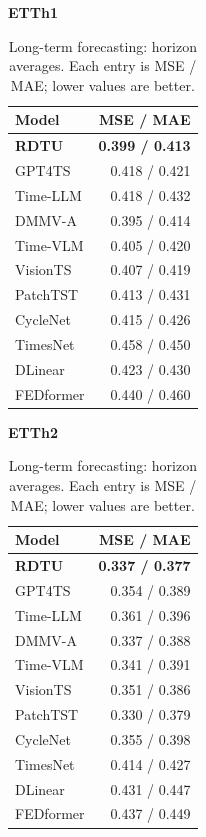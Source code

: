 \begin{table}[H]\centering\small
\caption{Long-term forecasting: horizon averages. Each entry is MSE / MAE; lower values are better.}\label{tab:long-term-forecasting-brief}
\begin{minipage}[t]{0.48\linewidth}\vspace{0pt}\centering\small
\textbf{ETTh1}\par\smallskip
\begin{tabular}{lr}\toprule Model & MSE / MAE\\\midrule
\rowcolor{blue!5}
\textbf{RDTU} & \textbf{0.399 / 0.413}\\
GPT4TS & 0.418 / 0.421\\
Time-LLM & 0.418 / 0.432\\
DMMV-A & 0.395 / 0.414\\
Time-VLM & 0.405 / 0.420\\
VisionTS & 0.407 / 0.419\\
PatchTST & 0.413 / 0.431\\
CycleNet & 0.415 / 0.426\\
TimesNet & 0.458 / 0.450\\
DLinear & 0.423 / 0.430\\
FEDformer & 0.440 / 0.460\\
\bottomrule\end{tabular}\end{minipage}\hfill\begin{minipage}[t]{0.48\linewidth}\vspace{0pt}\centering\small
\textbf{ETTh2}\par\smallskip
\begin{tabular}{lr}\toprule Model & MSE / MAE\\\midrule
\rowcolor{blue!5}
\textbf{RDTU} & \textbf{0.337 / 0.377}\\
GPT4TS & 0.354 / 0.389\\
Time-LLM & 0.361 / 0.396\\
DMMV-A & 0.337 / 0.388\\
Time-VLM & 0.341 / 0.391\\
VisionTS & 0.351 / 0.386\\
PatchTST & 0.330 / 0.379\\
CycleNet & 0.355 / 0.398\\
TimesNet & 0.414 / 0.427\\
DLinear & 0.431 / 0.447\\
FEDformer & 0.437 / 0.449\\
\bottomrule\end{tabular}\end{minipage}
\end{table}
